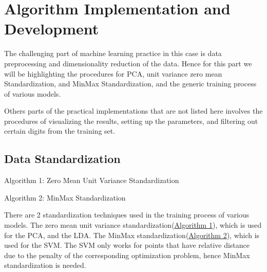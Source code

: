 \documentclass{article}
\begin{document}
\section{Algorithm Implementation and Development}
    \hspace{1.1em}
    The challenging part of machine learning practice in this case is data preprocessing and dimensionality reduction of the data. Hence for this part we will be highlighting the procedures for PCA, unit variance zero mean Standardization, and MinMax Standardization, and the generic training process of various models. 
    \par
    Others parts of the practical implementations that are not listed here involves the procedures of visualizing the results, setting up the parameters, and filtering out certain digits from the training set. 
    \subsection{Data Standardization}
        \begin{algorithm}\label{alg:algo1}
            \begin{algorithmic}[H]\scriptsize
            \end{algorithmic}\caption{Algorithm 1: Zero Mean Unit Variance Standardization}
        \end{algorithm}
        \begin{algorithm}\label{alg:algo2}\scriptsize
            \begin{algorithmic}[H]
            \end{algorithmic}\caption{Algorithm 2: MinMax Standardization}
        \end{algorithm}
        \par
        There are 2 standardization techniques used in the training process of various models. The zero mean unit variance standardization(\hyperref[alg:algo1]{Algorithm 1}), which is used for the PCA, and the LDA. The MinMax standardization(\hyperref[alg:algo2]{Algorithm 2}), which is used for the SVM. The SVM only works for points that have relative distance due to the penalty of the corresponding optimization problem, hence MinMax standardization is needed.
\end{document}
